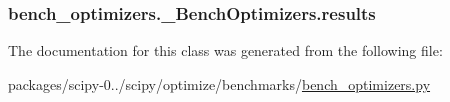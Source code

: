 \subsubsection[{results}]{\setlength{\rightskip}{0pt plus 5cm}bench\+\_\+optimizers.\+\_\+\+Bench\+Optimizers.\+results}\label{classbench__optimizers_1_1__BenchOptimizers_a2091e381f35bb5b7a8d88049369b5167}


The documentation for this class was generated from the following file\+:\begin{DoxyCompactItemize}
\item 
packages/scipy-\/0../scipy/optimize/benchmarks/\hyperlink{bench__optimizers_8py}{bench\+\_\+optimizers.\+py}\end{DoxyCompactItemize}
